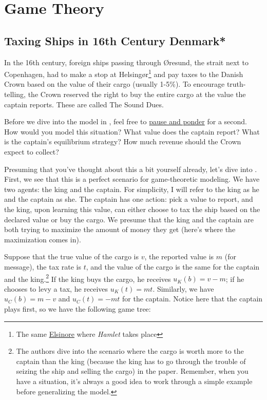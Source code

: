 \chapter{Game Theory}
\section{Taxing Ships in 16th Century Denmark*}\label{sec:denmark}

In the 16th century, foreign ships passing through Øresund, the strait next to Copenhagen, had to make a stop at Helsingør\footnote{The same \href{https://en.wikipedia.org/wiki/Hamlet}{Elsinore} where \textit{Hamlet} takes place} and pay taxes to the Danish Crown based on the value of their cargo (usually 1-5\%). To encourage truth-telling, the Crown reserved the right to buy the entire cargo at the value the captain reports. These are called The Sound Dues. 

Before we dive into the model in \citet{Haan_2012_Taxation}, feel free to \href{https://pbs.twimg.com/media/C1hNo_KUcAAJDQ9.jpg:large}{pause and ponder} for a second. How would you model this situation? What value does the captain report? What is the captain's equilibrium strategy? How much revenue should the Crown expect to collect?

Presuming that you've thought about this a bit yourself already, let's dive into \citet{Haan_2012_Taxation}. First, we see that this is a perfect scenario for game-theoretic modeling. We have two agents: the king and the captain. For simplicity, I will refer to the king as he and the captain as she. The captain has one action: pick a value to report, and the king, upon learning this value, can either choose to tax the ship based on the declared value or buy the cargo. We presume that the king and the captain are both trying to maximize the amount of money they get (here's where the maximization comes in). 

Suppose that the true value of the cargo is $v$, the reported value is $m$ (for message), the tax rate is $t$, and the value of the cargo is the same for the captain and the king.\footnote{The authors dive into the scenario where the cargo is worth more to the captain than the king (because the king has to go through the trouble of seizing the ship and selling the cargo) in the paper. Remember, when you have a situation, it's always a good idea to work through a simple example before generalizing the model.} If the king buys the cargo, he receives $u_K(b) = v - m$; if he chooses to levy a tax, he receives $u_K(t) = mt$. Similarly, we have $u_C(b) = m - v$ and $u_C(t) = -mt$ for the captain. Notice here that the captain plays first, so we have the following game tree:

